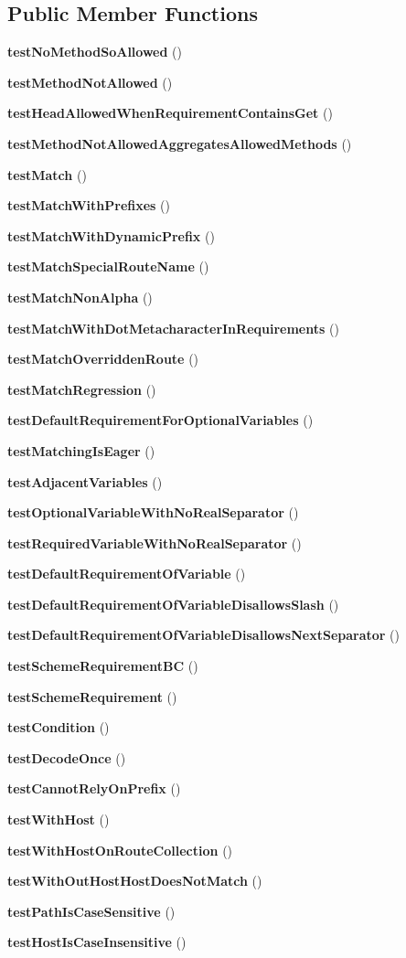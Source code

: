 \subsection*{Public Member Functions}
\begin{DoxyCompactItemize}
\item 
{\bf test\+No\+Method\+So\+Allowed} ()
\item 
{\bf test\+Method\+Not\+Allowed} ()
\item 
{\bf test\+Head\+Allowed\+When\+Requirement\+Contains\+Get} ()
\item 
{\bf test\+Method\+Not\+Allowed\+Aggregates\+Allowed\+Methods} ()
\item 
{\bf test\+Match} ()
\item 
{\bf test\+Match\+With\+Prefixes} ()
\item 
{\bf test\+Match\+With\+Dynamic\+Prefix} ()
\item 
{\bf test\+Match\+Special\+Route\+Name} ()
\item 
{\bf test\+Match\+Non\+Alpha} ()
\item 
{\bf test\+Match\+With\+Dot\+Metacharacter\+In\+Requirements} ()
\item 
{\bf test\+Match\+Overridden\+Route} ()
\item 
{\bf test\+Match\+Regression} ()
\item 
{\bf test\+Default\+Requirement\+For\+Optional\+Variables} ()
\item 
{\bf test\+Matching\+Is\+Eager} ()
\item 
{\bf test\+Adjacent\+Variables} ()
\item 
{\bf test\+Optional\+Variable\+With\+No\+Real\+Separator} ()
\item 
{\bf test\+Required\+Variable\+With\+No\+Real\+Separator} ()
\item 
{\bf test\+Default\+Requirement\+Of\+Variable} ()
\item 
{\bf test\+Default\+Requirement\+Of\+Variable\+Disallows\+Slash} ()
\item 
{\bf test\+Default\+Requirement\+Of\+Variable\+Disallows\+Next\+Separator} ()
\item 
{\bf test\+Scheme\+Requirement\+B\+C} ()
\item 
{\bf test\+Scheme\+Requirement} ()
\item 
{\bf test\+Condition} ()
\item 
{\bf test\+Decode\+Once} ()
\item 
{\bf test\+Cannot\+Rely\+On\+Prefix} ()
\item 
{\bf test\+With\+Host} ()
\item 
{\bf test\+With\+Host\+On\+Route\+Collection} ()
\item 
{\bf test\+With\+Out\+Host\+Host\+Does\+Not\+Match} ()
\item 
{\bf test\+Path\+Is\+Case\+Sensitive} ()
\item 
{\bf test\+Host\+Is\+Case\+Insensitive} ()
\end{DoxyCompactItemize}
